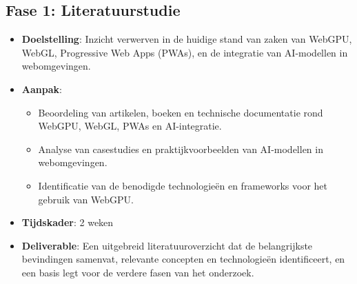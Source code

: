 



\subsection*{Fase 1: Literatuurstudie}
\begin{itemize}
  \item \textbf{Doelstelling}: Inzicht verwerven in de huidige stand van zaken van WebGPU, WebGL, Progressive Web Apps (PWAs), en de integratie van AI-modellen in webomgevingen.

  \item \textbf{Aanpak}:
  \begin{itemize}
    \item Beoordeling van artikelen, boeken en technische documentatie rond WebGPU, WebGL, PWAs en AI-integratie.
    \item Analyse van casestudies en praktijkvoorbeelden van AI-modellen in webomgevingen.
    \item Identificatie van de benodigde technologieën en frameworks voor het gebruik van WebGPU.
  \end{itemize}

  \item \textbf{Tijdskader}: 2 weken
  \item \textbf{Deliverable}: Een uitgebreid literatuuroverzicht dat de belangrijkste bevindingen samenvat, relevante concepten en technologieën identificeert, en een basis legt voor de verdere fasen van het onderzoek.
\end{itemize}

